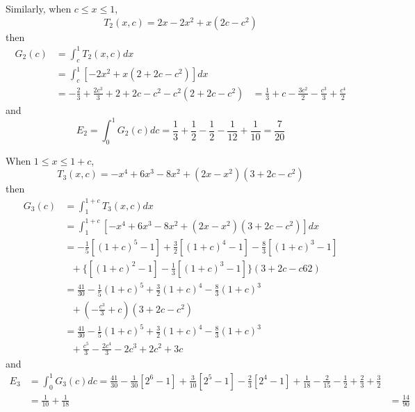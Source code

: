 \documentclass[12pt]{simple_doc}
\begin{document}
    Similarly, when $c \leqslant x \leqslant 1$,
    \begin{equation}
        T_2(x, c) = 2x - 2x^2 + x(2c - c^2)
    \end{equation}
    then
    \begin{equation}
		\begin{aligned}
		G_2(c) &= \int_c^1 T_2(x, c) dx \\
		   &= \int_c^1 [- 2x^2 + x(2 + 2c - c^2)] dx\\
           &= -\frac{2}{3} + \frac{2c^3}{3} + 2 + 2c -c^2 -c^2(2 + 2c - c^2)
           &= \frac{1}{3} + c - \frac{3c^2}{2} - \frac{c^3}{3} + \frac{c^4}{2}
		\end{aligned}
    \end{equation}
    and
    \begin{equation}
        E_2 = \int_0^1 G_2(c)dc = \frac{1}{3} + \frac{1}{2}  - \frac{1}{2}
            - \frac{1}{12} + \frac{1}{10} = \frac{7}{20}
    \end{equation}

    When $1 \leqslant x \leqslant 1 + c$,
    \begin{equation}
        T_3(x, c) = -x^4 +6x^3 -8x^2 + (2x - x^2)(3 + 2c - c^2)
    \end{equation}
    then
    \begin{equation}
		\begin{aligned}
		G_3(c) &= \int_1^{1+c} T_3(x, c) dx \\
		   &= \int_1^{1+c} [-x^4 +6x^3 -8x^2 + (2x - x^2)(3 + 2c - c^2)] dx\\
           &= -\frac{1}{5}[(1+c)^5 - 1] + \frac{3}{2}[(1+c)^4 - 1] - \frac{8}{3}[(1+c)^3 - 1]\\
           &\ \ \ + \{[(1+c)^2 - 1] - \frac{1}{3}[(1+c)^3 - 1]\}(3 + 2c - c62)\\
           &= \frac{41}{30} - \frac{1}{5}(1+c)^5 + \frac{3}{2}(1+c)^4 - \frac{8}{3}(1+c)^3\\
           &\ \ \ + (-\frac{c^3}{3} + c)(3 + 2c - c^2)\\
           &= \frac{41}{30} - \frac{1}{5}(1+c)^5 + \frac{3}{2}(1+c)^4 - \frac{8}{3}(1+c)^3\\
           &\ \ \ + \frac{c^5}{3} - \frac{2c^4}{3} -2c^3 + 2c^2 + 3c
		\end{aligned}
    \end{equation}
    and
    \begin{equation}
        \begin{aligned}
        E_3 &= \int_0^1 G_3(c)dc = \frac{41}{30} - \frac{1}{30}[2^6 - 1] + \frac{3}{10}[2^5 - 1]
                - \frac{2}{3}[2^4 - 1] + \frac{1}{18} - \frac{2}{15} - \frac{1}{2}
                + \frac{2}{3} + \frac{3}{2}\\
            &= \frac{1}{10} + \frac{1}{18}
            &= \frac{14}{90}
        \end{aligned}
    \end{equation}
\end{document}
